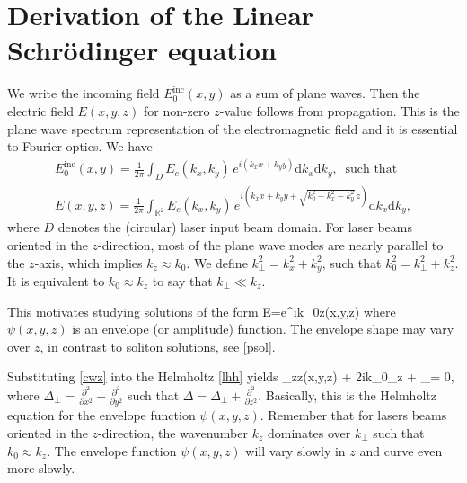 \section{Derivation of the Linear Schr\"odinger equation}
\revgroup
\label{parax}
We write the incoming field $E_0^\text{inc}(x,y)$ as a sum of plane waves. Then
the electric field $E(x,y,z)$ for non-zero $z$-value follows from propagation.
This is the plane wave spectrum representation of the electromagnetic field and
it is essential to Fourier optics. We have
%
\begin{gather*} 
E_0^\text{inc}(x,y) = \frac{1}{2\pi}\int_D E_c(k_x,k_y)\, e^{i(k_x x+k_y y)}
\mathrm{d}k_x\mathrm{d}k_y,~\text{ such that }\\ 
E(x,y,z) = \frac{1}{2\pi}\int_{\mathbb{R}^2} E_c(k_x,k_y)\,e^{i(k_x x+k_y y+
\sqrt{k_0^2-k_x^2-k_y^2}\,z)}\mathrm{d}k_x\mathrm{d}k_y,
\end{gather*}
%
where $D$ denotes the (circular) laser input beam domain. 
For laser beams oriented in the $z$-direction, most of the plane wave modes 
are nearly parallel to the $z$-axis, which implies $k_z\approx k_0$. We define
$k_\perp^2 = k_x^2 + k_y^2$, such that $k_0^2 = k_\perp^2 + k_z^2$. It is
equivalent to $k_0\approx k_z$ to say that $k_\perp \ll k_z$. 

This motivates studying solutions of the form
\be \label{cwz}
E=e^{ik_0z}\psi(x,y,z)
\ee
%
where $\psi(x,y,z)$ is an envelope (or amplitude) function. The envelope shape
may vary over $z$, in contrast to soliton solutions, see \eqref{psol}. 
\endgroup

Substituting \eqref{cwz} into the Helmholtz \cref{lhh} yields
%
\be \label{phh}
\psi_{zz}(x,y,z) + 2ik_0\psi_z + \Delta_\perp\psi = 0,
\ee
%
where $\Delta_\perp=\frac{\partial^2}{\partial x^2}
+\frac{\partial^2}{\partial y^2}$ such that $\Delta = \Delta_\perp + 
\frac{\partial^2}{\partial z^2}$. Basically, this is the Helmholtz equation for
the envelope function $\psi(x,y,z)$. Remember that for lasers beams oriented in
the $z$-direction, the wavenumber $k_z$ dominates over $k_\perp$ such that 
$k_0\approx k_z$. The envelope function $\psi(x,y,z)$  will vary slowly 
in $z$ and curve even more slowly. 

